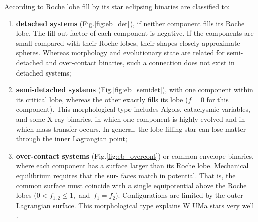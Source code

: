 According to Roche lobe fill by its star eclipsing binaries are classified to:
\begin{enumerate}
\item \textbf{detached systems} (Fig.\ref{fig:eb_det}), if neither component fills its Roche lobe.
The fill-out factor of each component is negative. If the components are small compared with their 
Roche lobes, their shapes closely approximate spheres. Whereas morphology and evolutionary state are related 
for semi-detached and over-contact binaries, such a connection does not exist in detached systems;
\item \textbf{semi-detached systems} (Fig.\ref{fig:eb_semidet}), %
with one component within its critical lobe, whereas the other exactly fills its lobe ($f = 0$ for this component). This morphological
type includes Algols, cataclysmic variables, and some X-ray binaries, in which
one component is highly evolved and in which mass transfer occurs. In general, the lobe-filling star can
lose matter through the inner Lagrangian point;
\item \textbf{over-contact systems} (Fig.\ref{fig:eb_overcont}) %
or common envelope binaries, where each component has
a surface larger than its Roche lobe. Mechanical equilibrium requires that the sur-
faces match in potential. That is, the common surface must coincide with a single
equipotential above the Roche lobes ($0 < f_{1,2} \leq 1$,~and~$f_{1} = f_{2}$). Configurations
are limited by the outer Lagrangian surface. This morphological type explains W UMa stars very well \citep{kallrath2009eclipsing}. %
\end{enumerate}

